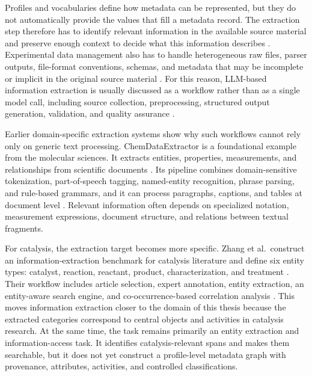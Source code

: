 Profiles and vocabularies define how metadata can be represented, but they do not automatically provide the values that fill a metadata record.
The extraction step therefore has to identify relevant information in the available source material and preserve enough context to decide what this information describes \cite{Fan2024OpenChemIE}.
Experimental data management also has to handle heterogeneous raw files, parser outputs, file-format conventions, schemas, and metadata that may be incomplete or implicit in the original source material \cite{duke2022datastorage}.
For this reason, \ac{LLM}-based information extraction is usually discussed as a workflow rather than as a single model call, including source collection, preprocessing, structured output generation, validation, and quality assurance \cite{schilling2025text}.

Earlier domain-specific extraction systems show why such workflows cannot rely only on generic text processing.
ChemDataExtractor is a foundational example from the molecular sciences.
It extracts entities, properties, measurements, and relationships from scientific documents \cite{swain2016chemdataextractor}.
Its pipeline combines domain-sensitive tokenization, part-of-speech tagging, named-entity recognition, phrase parsing, and rule-based grammars, and it can process paragraphs, captions, and tables at document level \cite{swain2016chemdataextractor}.
Relevant information often depends on specialized notation, measurement expressions, document structure, and relations between textual fragments.

For catalysis, the extraction target becomes more specific.
Zhang et al.\ construct an information-extraction benchmark for catalysis literature and define six entity types: catalyst, reaction, reactant, product, characterization, and treatment \cite{zhang2022knowledge}.
Their workflow includes article selection, expert annotation, entity extraction, an entity-aware search engine, and co-occurrence-based correlation analysis \cite{zhang2022knowledge}.
This moves information extraction closer to the domain of this thesis because the extracted categories correspond to central objects and activities in catalysis research.
At the same time, the task remains primarily an entity extraction and information-access task.
It identifies catalysis-relevant spans and makes them searchable, but it does not yet construct a profile-level metadata graph with provenance, attributes, activities, and controlled classifications.

